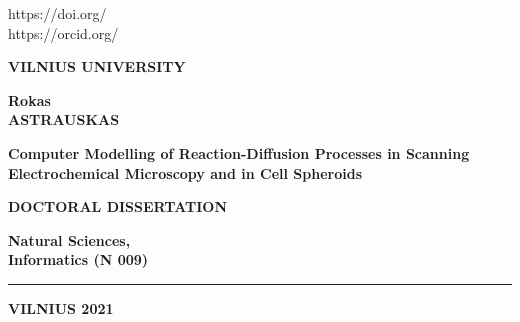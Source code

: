 \thispagestyle{empty}                   %
{\selectfont
\renewcommand\bfdefault{bc}%
\selectfont

\begin{flushright}
https://doi.org/ \\ %
https://orcid.org/ %
\end{flushright}
\begin{center}

	\vspace*{5mm}	
	\begin{flushleft}
\renewcommand\bfdefault{bc}
\bf \large
	VILNIUS UNIVERSITY \\
	\end{flushleft}
	
	
	\vspace{50mm}
	\begin{flushleft}
	{\Large \bf  Rokas\\ ASTRAUSKAS\par}
    \end{flushleft}

	\vspace{10mm}
	\begin{flushleft}
	{\huge \bf
\fontsize{21}{21}\selectfont
	Computer Modelling of Reaction-Diffusion Processes in Scanning Electrochemical Microscopy and in Cell Spheroids \par
	}
    \end{flushleft}

    \vspace{5mm}
\begin{flushleft}
\renewcommand\bfdefault{b}
  {\bf DOCTORAL DISSERTATION}\\%
\end{flushleft}
  \vspace{15mm}
  \begin{flushleft}
\renewcommand\bfdefault{bc}
\bf
  Natural Sciences, \\
  Informatics (N 009)
  \end{flushleft}
     \begin{flushleft} 
  		\noindent\rule{3cm}{0.4pt}
     \end{flushleft} 
   \begin{flushleft} \bf
  VILNIUS 2021
   \end{flushleft} 
\end{center}
}
\newpage
\thispagestyle{empty}                   %

